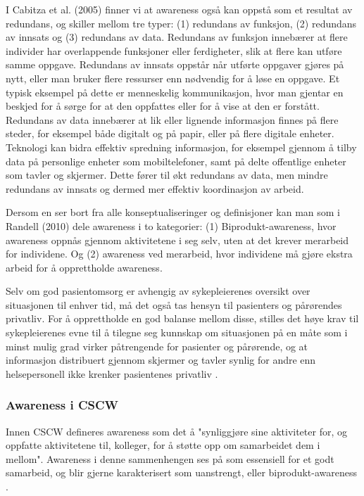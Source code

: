 \noindent
I Cabitza et al. (2005) \nocite{Cabitza} finner vi at awareness også kan oppstå som et resultat av redundans, og skiller mellom tre typer: (1) redundans av funksjon, (2) redundans av innsats og (3) redundans av data. Redundans av funksjon innebærer at flere individer har overlappende funksjoner eller ferdigheter, slik at flere kan utføre samme oppgave. Redundans av innsats oppstår når utførte oppgaver gjøres på nytt, eller man bruker flere ressurser enn nødvendig for å løse en oppgave. Et typisk eksempel på dette er menneskelig kommunikasjon, hvor man gjentar en beskjed for å sørge for at den oppfattes eller for å vise at den er forstått. Redundans av data innebærer at lik eller lignende informasjon finnes på flere steder, for eksempel både digitalt og på papir, eller på flere digitale enheter. Teknologi kan bidra effektiv spredning informasjon, for eksempel gjennom å tilby data på personlige enheter som mobiltelefoner, samt på delte offentlige enheter som tavler og skjermer. Dette fører til økt redundans av data, men mindre redundans av innsats og dermed mer effektiv koordinasjon av arbeid.

\noindent
Dersom en ser bort fra alle konseptualiseringer og definisjoner kan man som i Randell (2010) dele awareness i to kategorier: (1) Biprodukt-awareness, hvor awareness oppnås gjennom aktivitetene i seg selv, uten at det krever merarbeid for individene. Og (2) awareness ved merarbeid, hvor individene må gjøre ekstra arbeid for å opprettholde awareness. 

\noindent
Selv om god pasientomsorg er avhengig av sykepleierenes oversikt over situasjonen til enhver tid, må det også tas hensyn til pasienters og pårørendes privatliv. For å opprettholde en god balanse mellom disse, stilles det høye krav til sykepleierenes evne til å tilegne seg kunnskap om situasjonen på en måte som i minst mulig grad virker påtrengende for pasienter og pårørende, og at informasjon distribuert gjennom skjermer og tavler synlig for andre enn helsepersonell ikke krenker pasientenes privatliv \cite{Ebright10}.

\subsubsection{Awareness i CSCW}
Innen CSCW defineres awareness som det å "synliggjøre sine aktiviteter for, og oppfatte aktivitetene til, kolleger, for å støtte opp om samarbeidet dem i mellom". Awareness i denne sammenhengen ses på som essensiell for et godt samarbeid, og blir gjerne karakterisert som uanstrengt, eller biprodukt-awareness \cite{Randell}. 

